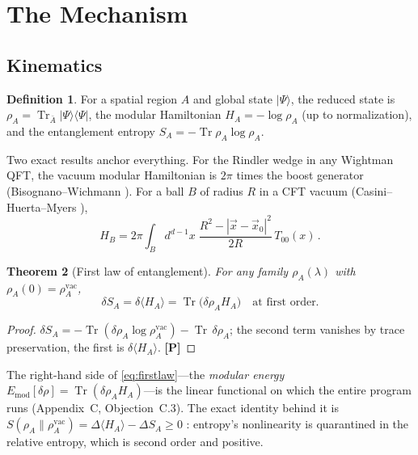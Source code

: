 \documentclass[11pt]{article}
\newtheorem{theorem}{Theorem}[section]
\theoremstyle{definition}
\newtheorem{definition}[theorem]{Definition}
\newcommand{\pP}{\textbf{[P]}}
\newcommand{\Tr}{\operatorname{Tr}}
\begin{document}
\section{The Mechanism}

\subsection{Kinematics}

\begin{definition}
For a spatial region $A$ and global state $|\Psi\rangle$, the reduced
state is $\rho_A=\Tr_{\bar A}|\Psi\rangle\langle\Psi|$, the modular
Hamiltonian $H_A=-\log\rho_A$ (up to normalization), and the entanglement
entropy $S_A=-\Tr\rho_A\log\rho_A$.
\end{definition}

Two exact results anchor everything. For the Rindler wedge in any Wightman
QFT, the vacuum modular Hamiltonian is $2\pi$ times the boost generator
(Bisognano--Wichmann \cite{BisognanoWichmann1976}). For a ball $B$ of
radius $R$ in a CFT vacuum (Casini--Huerta--Myers \cite{CHM2011}),
\begin{equation}
H_B=2\pi\!\int_B d^{d-1}x\;\frac{R^2-|\vec x-\vec x_0|^2}{2R}\,
T_{00}(x)\,.
\label{eq:CHM}
\end{equation}

\begin{theorem}[First law of entanglement]
\label{thm:firstlaw}
For any family $\rho_A(\lambda)$ with $\rho_A(0)=\rho_A^{\mathrm{vac}}$,
\begin{equation}
\delta S_A=\delta\langle H_A\rangle=\Tr\!\big(\delta\rho_A H_A\big)
\quad\text{at first order.}
\label{eq:firstlaw}
\end{equation}
\end{theorem}

\begin{proof}
$\delta S_A=-\Tr(\delta\rho_A\log\rho_A^{\mathrm{vac}})-\Tr\,\delta\rho_A$;
the second term vanishes by trace preservation, the first is
$\delta\langle H_A\rangle$. \pP{}
\end{proof}

The right-hand side of \eqref{eq:firstlaw}---the \emph{modular energy}
$E_{\mathrm{mod}}[\delta\rho]=\Tr(\delta\rho_A H_A)$---is the linear
functional on which the entire program runs (Appendix~C, Objection~C.3).
The exact identity behind it is
$S(\rho_A\|\rho_A^{\mathrm{vac}})=\Delta\langle H_A\rangle-\Delta S_A
\ge0$ \cite{Casini2008,BlancoCasini2013}: entropy's nonlinearity is
quarantined in the relative entropy, which is second order and positive.
\end{document}
